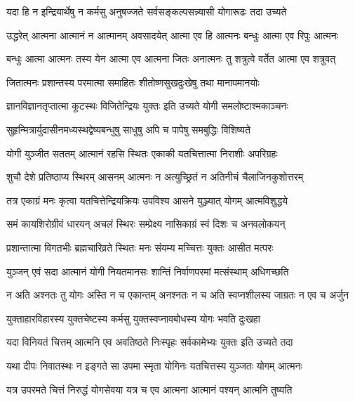 \twolineshloka
{यदा हि न इन्द्रियार्थेषु न कर्मसु अनुषज्जते}
{सर्वसङ्कल्पसन्न्यासी योगारूढः तदा उच्यते}%

\twolineshloka
{उद्धरेत् आत्मना आत्मानं न आत्मानम् अवसादयेत्}
{आत्मा एव हि आत्मनः बन्धुः आत्मा एव रिपुः आत्मनः}%

\twolineshloka
{बन्धुः आत्मा आत्मनः तस्य येन आत्मा एव आत्मना जितः}
{अनात्मनः तु शत्रुत्वे वर्तेत आत्मा एव शत्रुवत्}%

\twolineshloka
{जितात्मनः प्रशान्तस्य परमात्मा समाहितः}
{शीतोष्णसुखदुःखेषु तथा मानापमानयोः}%

\twolineshloka
{ज्ञानविज्ञानतृप्तात्मा कूटस्थः विजितेन्द्रियः}
{युक्तः इति उच्यते योगी समलोष्टाश्मकाञ्चनः}%

\twolineshloka
{सुहृन्मित्रार्युदासीनमध्यस्थद्वेष्यबन्धुषु}
{साधुषु अपि च पापेषु समबुद्धिः विशिष्यते}%

\twolineshloka
{योगी युञ्जीत सततम् आत्मानं रहसि स्थितः}
{एकाकी यतचित्तात्मा निराशीः अपरिग्रहः}%

\twolineshloka
{शुचौ देशे प्रतिष्ठाप्य स्थिरम् आसनम् आत्मनः}
{न अत्युच्छ्रितं न अतिनीचं चैलाजिनकुशोत्तरम्}%

\twolineshloka
{तत्र एकाग्रं मनः कृत्वा यतचित्तेन्द्रियक्रियः}
{उपविश्य आसने युञ्ज्यात् योगम् आत्मविशुद्धये}%

\twolineshloka
{समं कायशिरोग्रीवं धारयन् अचलं स्थिरः}
{सम्प्रेक्ष्य नासिकाग्रं स्वं दिशः च अनवलोकयन्}%

\twolineshloka
{प्रशान्तात्मा विगतभीः ब्रह्मचारिव्रते स्थितः}
{मनः संयम्य मच्चित्तः युक्तः आसीत मत्परः}%

\twolineshloka
{युञ्जन् एवं सदा आत्मानं योगी नियतमानसः}
{शान्तिं निर्वाणपरमां मत्संस्थाम् अधिगच्छति}%

\twolineshloka
{न अति अश्नतः तु योगः अस्ति न च एकान्तम् अनश्नतः}
{न च अति स्वप्नशीलस्य जाग्रतः न एव च अर्जुन}%

\twolineshloka
{युक्ताहारविहारस्य युक्तचेष्टस्य कर्मसु}
{युक्तस्वप्नावबोधस्य योगः भवति दुःखहा}%

\twolineshloka
{यदा विनियतं चित्तम् आत्मनि एव अवतिष्ठते}
{निःस्पृहः सर्वकामेभ्यः युक्तः इति उच्यते तदा}%

\twolineshloka
{यथा दीपः निवातस्थः न इङ्गते सा उपमा स्मृता}
{योगिनः यतचित्तस्य युञ्जतः योगम् आत्मनः}%

\twolineshloka
{यत्र उपरमते चित्तं निरुद्धं योगसेवया}
{यत्र च एव आत्मना आत्मानं पश्यन् आत्मनि तुष्यति}%

